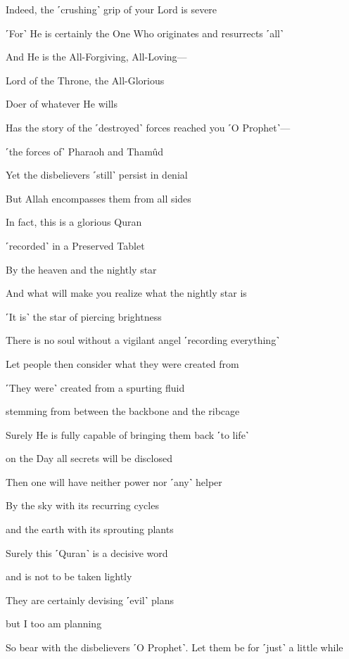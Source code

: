 Indeed, the ˹crushing˺ grip of your Lord is severe

˹For˺ He is certainly the One Who originates and resurrects ˹all˺

And He is the All-Forgiving, All-Loving—

Lord of the Throne, the All-Glorious

Doer of whatever He wills

Has the story of the ˹destroyed˺ forces reached you ˹O Prophet˺—

˹the forces of˺ Pharaoh and Thamûd

Yet the disbelievers ˹still˺ persist in denial

But Allah encompasses them from all sides

In fact, this is a glorious Quran

˹recorded˺ in a Preserved Tablet

By the heaven and the nightly star

And what will make you realize what the nightly star is

˹It is˺ the star of piercing brightness

There is no soul without a vigilant angel ˹recording everything˺

Let people then consider what they were created from

˹They were˺ created from a spurting fluid

stemming from between the backbone and the ribcage

Surely He is fully capable of bringing them back ˹to life˺

on the Day all secrets will be disclosed

Then one will have neither power nor ˹any˺ helper

By the sky with its recurring cycles

and the earth with its sprouting plants

Surely this ˹Quran˺ is a decisive word

and is not to be taken lightly

They are certainly devising ˹evil˺ plans

but I too am planning

So bear with the disbelievers ˹O Prophet˺. Let them be for ˹just˺ a little while

